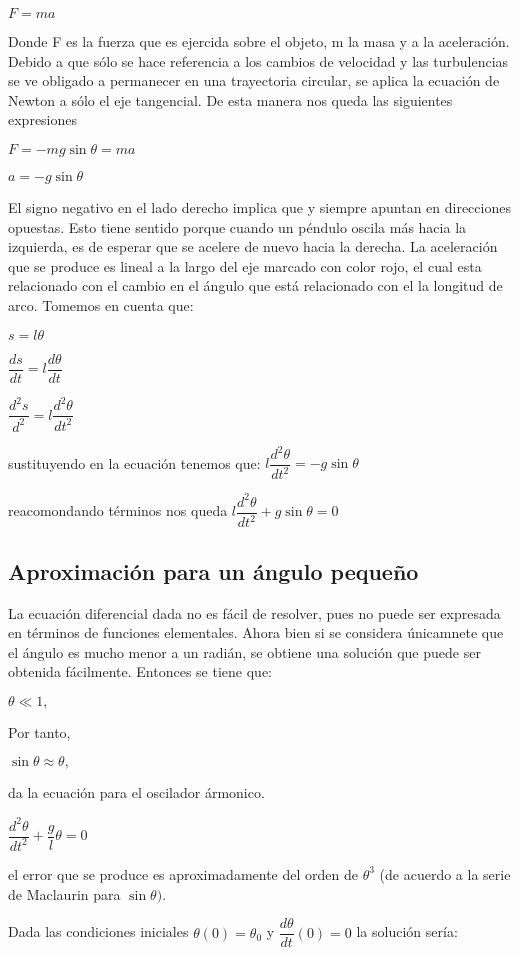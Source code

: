 \documentclass[12pt]{article}
\begin{document}
$F=ma$

Donde F es la fuerza que es ejercida sobre el objeto, m la masa y a la aceleración. Debido a que sólo se hace referencia a los cambios de velocidad y las turbulencias se ve obligado a permanecer en una trayectoria circular, se aplica la ecuación de Newton a sólo el eje tangencial. De esta manera nos queda las siguientes expresiones 

$F=-mg\sin\theta=ma$

$a=-g\sin\theta$

 El signo negativo en el lado derecho implica que \theta y siempre apuntan en direcciones opuestas. Esto tiene sentido porque cuando un péndulo oscila más hacia la izquierda, es de esperar que se acelere de nuevo hacia la derecha.
La aceleración que se produce es lineal a la largo del eje marcado con color rojo, el cual esta relacionado con el cambio en el ángulo \theta que está relacionado con el la longitud de arco. Tomemos en cuenta que:

$ s=l\theta$

$\dfrac{ds}{dt}= l\dfrac{d\theta}{dt}$


$\dfrac{d^2s}{d^2}= l\dfrac{d^2\theta}{dt^2}$

sustituyendo en la ecuación  tenemos que:
$l\dfrac{d^2\theta}{dt^2}=-g\sin\theta$


reacomondando términos nos queda
$l\dfrac{d^2\theta}{dt^2}+ g\sin\theta = 0$


\subsection*{Aproximación para un ángulo pequeño}
La ecuación diferencial dada no es fácil de resolver, pues no puede ser expresada en términos de funciones elementales. Ahora bien si se considera únicamnete que el ángulo es mucho menor a un radián, se obtiene una solución que puede ser obtenida fácilmente. Entonces se tiene que:

$\theta\ll1,$

Por tanto,

$\sin\theta\approx\theta,$

da la ecuación para el oscilador ármonico.

$\dfrac{d^2\theta}{dt^2}+\dfrac{g}{l}\theta=0$

el error que se produce es aproximadamente del orden de $\theta^3$ (de acuerdo a la serie de Maclaurin para $\sin\theta)$.

Dada las condiciones iniciales $\theta(0)=\theta_0$ y $\dfrac{d\theta}{dt}(0)=0$ la solución sería:
\end{document}
